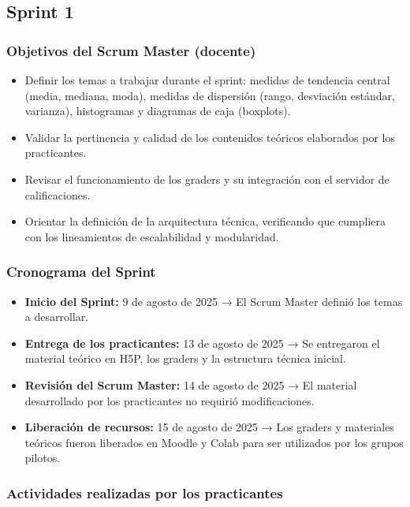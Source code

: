 \documentclass[letter,oneside,12pt,spanish]{report}
\begin{document}
\subsection{Sprint 1}

\subsubsection*{Objetivos del Scrum Master (docente)}
\begin{itemize}
	\item Definir los temas a trabajar durante el sprint: medidas de tendencia central (media, mediana, moda), medidas de dispersión (rango, desviación estándar, varianza), histogramas y diagramas de caja (boxplots).
	\item Validar la pertinencia y calidad de los contenidos teóricos elaborados por los practicantes.
	\item Revisar el funcionamiento de los graders y su integración con el servidor de calificaciones.
	\item Orientar la definición de la arquitectura técnica, verificando que cumpliera con los lineamientos de escalabilidad y modularidad.
\end{itemize}

\subsubsection*{Cronograma del Sprint}
\begin{itemize}
	\item \textbf{Inicio del Sprint:} 9 de agosto de 2025 → El Scrum Master definió los temas a desarrollar.
	\item \textbf{Entrega de los practicantes:} 13 de agosto de 2025 → Se entregaron el material teórico en H5P, los graders y la estructura técnica inicial.
	\item \textbf{Revisión del Scrum Master:} 14 de agosto de 2025 → El material desarrollado por los practicantes no requirió modificaciones.
	\item \textbf{Liberación de recursos:} 15 de agosto de 2025 → Los graders y materiales teóricos fueron liberados en Moodle y Colab para ser utilizados por los grupos pilotos.
\end{itemize}

\subsubsection*{Actividades realizadas por los practicantes}
\end{document}
